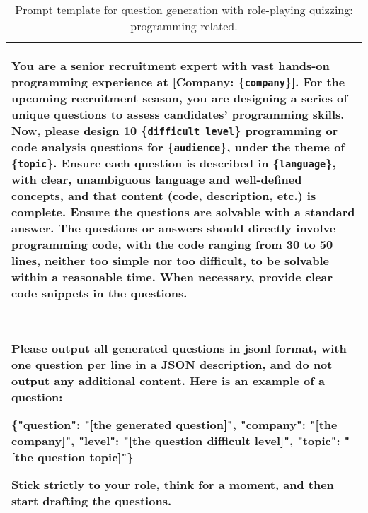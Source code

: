 \begin{table*}[tbh!]
  \caption{Prompt template for question generation with role-playing quizzing: programming-related.}
  \label{tab:prompt-rpq-code}
  \small
  \begin{tabularx}{\textwidth}{X}
    \toprule
        You are a senior recruitment expert with vast hands-on programming experience at 
        [Company: \{\texttt{company}\}]. For the upcoming recruitment season, you are designing a series of unique questions to assess candidates' programming skills. Now, please design 10 \{\texttt{difficult level}\} programming or code analysis questions for \{\texttt{audience}\}, under the theme of \{\texttt{topic}\}. Ensure each question is described in \{\texttt{language}\}, with clear, unambiguous language and well-defined concepts, and that content (code, description, etc.) is complete. Ensure the questions are solvable with a standard answer. The questions or answers should directly involve programming code, with the code ranging from 30 to 50 lines, neither too simple nor too difficult, to be solvable within a reasonable time. When necessary, provide clear code snippets in the questions.

        \ 
        
        Please output all generated questions in jsonl format, with one question per line in a JSON description, and do not output any additional content. Here is an example of a question:

        \{"question": "[the generated question]", "company": "[the company]", "level": "[the question difficult level]", "topic": "[the question topic]"\}

        Stick strictly to your role, think for a moment, and then start drafting the questions. \\
    \bottomrule
  \end{tabularx}
\end{table*}


